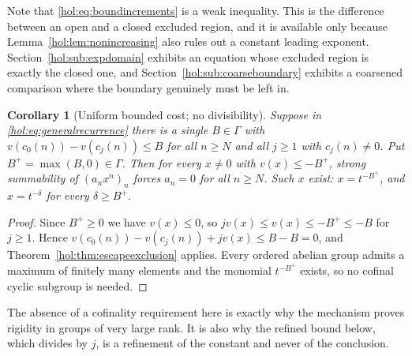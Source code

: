 \documentclass[11pt]{article}
\numberwithin{equation}{section}
\newtheorem{corollary}[theorem]{Corollary}
\theoremstyle{definition}
\theoremstyle{remark}
\begin{document}
Note that \eqref{hol:eq:boundincrements} is a weak inequality. This is the
difference between an open and a closed excluded region, and it is available
only because Lemma~\ref{hol:lem:nonincreasing} also rules out a constant
leading exponent. Section~\ref{hol:sub:expdomain} exhibits an equation whose
excluded region is exactly the closed one, and
Section~\ref{hol:sub:coarseboundary} exhibits a coarsened comparison where the
boundary genuinely must be left in.

\begin{corollary}[Uniform bounded cost; no divisibility]
\label{hol:cor:boundedcost}
Suppose in \eqref{hol:eq:generalrecurrence} there is a single $B\in\Gamma$ with
$v(c_0(n))-v(c_j(n))\le B$ for all $n\ge N$ and all $j\ge1$ with $c_j(n)\ne0$.
Put $B^{+}=\max(B,0)\in\Gamma$. Then for every $x\ne0$ with $v(x)\le-B^{+}$,
strong summability of $(a_nx^n)_n$ forces $a_n=0$ for all $n\ge N$. Such $x$
exist: $x=t^{-B^{+}}$, and $x=t^{-\delta}$ for every $\delta\ge B^{+}$.
\end{corollary}

\begin{proof}
Since $B^{+}\ge0$ we have $v(x)\le0$, so $jv(x)\le v(x)\le-B^{+}\le-B$ for
$j\ge1$. Hence
$v(c_0(n))-v(c_j(n))+jv(x)\le B-B=0$, and
Theorem~\ref{hol:thm:escapeexclusion} applies. Every ordered abelian group
admits a maximum of finitely many elements and the monomial $t^{-B^{+}}$
exists, so no cofinal cyclic subgroup is needed.
\end{proof}

The absence of a cofinality requirement here is exactly why the mechanism
proves rigidity in groups of very large rank. It is also why the refined
bound below, which divides by $j$, is a refinement of the constant and never
of the conclusion.
\end{document}
